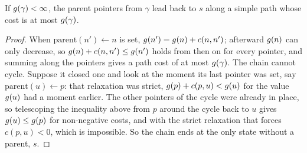 \begin{proposition}
\label{thm:ch06-pointer}
If $g(\gamma) < \infty$, the parent pointers from $\gamma$ lead back to
$s$ along a simple path whose cost is at most $g(\gamma)$.
\end{proposition}
\begin{proof}
When $\mathrm{parent}(n') \gets n$ is set, $g(n') = g(n) + c(n,
n')$; afterward $g(n)$ can only decrease, so $g(n) + c(n, n') \le
g(n')$ holds from then on for every pointer, and summing along the
pointers gives a path cost of at most $g(\gamma)$. The chain cannot
cycle. Suppose it closed one and look at the moment its last pointer was set,
say $\mathrm{parent}(u) \gets p$: that relaxation was strict, $g(p) +
c(p,u) < g(u)$ for the value $g(u)$ had a moment earlier. The other
pointers of the cycle were already in place, so telescoping the inequality
above from $p$ around the cycle back to $u$ gives $g(u) \le g(p)$
for non-negative costs, and with the strict relaxation that forces $c(p,u) <
0$, which is impossible. So the chain ends at the only state without a parent,
$s$.
\end{proof}

